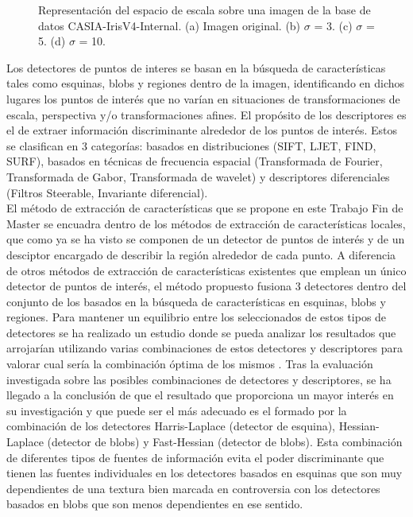 \begin{figure}[htbp]
\centering
{}
\caption{Representación del espacio de escala sobre una imagen de la base de datos CASIA-IrisV4-Internal. (a) Imagen original. (b) $\sigma$ = 3. (c) $\sigma$ = 5. (d) $\sigma$ = 10.} \label{fig:señales}
\end{figure}

Los detectores de puntos de interes se basan en la búsqueda de características tales como esquinas, blobs y regiones dentro de la imagen, identificando en dichos lugares los puntos de interés que no varían en situaciones de transformaciones de escala, perspectiva y/o transformaciones afines. El propósito de los descriptores es el de extraer información discriminante alrededor de los puntos de interés. Estos se clasifican en 3 categorías: basados en distribuciones (SIFT, LJET, FIND, SURF), basados en técnicas de frecuencia espacial (Transformada de Fourier, Transformada de Gabor, Transformada de wavelet) y descriptores diferenciales (Filtros Steerable, Invariante diferencial). \\

El método de extracción de características que se propone en este Trabajo Fin de Master se encuadra dentro de los métodos de extracción de características locales, que como ya se ha visto se componen de un detector de puntos de interés y de un desciptor encargado de describir la región alrededor de cada punto. A diferencia de otros métodos de extracción de características existentes que emplean un único detector de puntos de interés, el método propuesto fusiona 3 detectores dentro del conjunto de los basados en la búsqueda de características en esquinas, blobs y regiones. Para mantener un equilibrio entre los seleccionados de estos tipos de detectores se ha realizado un estudio donde se pueda analizar los resultados que arrojarían utilizando varias combinaciones de estos detectores y descriptores para valorar cual sería la combinación óptima de los mismos \cite{Reference23} \cite{Reference24} \cite{Reference25}. Tras la evaluación investigada sobre las posibles combinaciones de detectores y descriptores, se ha llegado a la conclusión de que el resultado que proporciona un mayor interés en su investigación y que puede ser el más adecuado es el formado por la combinación de los detectores Harris-Laplace (detector de esquina), Hessian-Laplace (detector de blobs) y Fast-Hessian (detector de blobs). Esta combinación de diferentes tipos de fuentes de información evita el poder discriminante que tienen las fuentes individuales en los detectores basados en esquinas que son muy dependientes de una textura bien marcada en controversia con los detectores basados en blobs que son menos dependientes en ese sentido.


